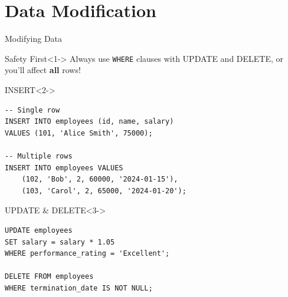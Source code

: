 \documentclass[aspectratio=169,11pt]{beamer}
\begin{document}
\section{Data Modification}
\begin{frame}[fragile]{Modifying Data}
\begin{alertblock}{\textcolor{red}{} Safety First}<1->
Always use \texttt{WHERE} clauses with UPDATE and DELETE, or you'll affect \textbf{all} rows!
\end{alertblock}

\pause
\begin{exampleblock}{INSERT}<2->
\begin{lstlisting}
-- Single row
INSERT INTO employees (id, name, salary)
VALUES (101, 'Alice Smith', 75000);

-- Multiple rows
INSERT INTO employees VALUES
    (102, 'Bob', 2, 60000, '2024-01-15'),
    (103, 'Carol', 2, 65000, '2024-01-20');
\end{lstlisting}
\end{exampleblock}

\pause
\begin{exampleblock}{UPDATE \& DELETE}<3->
\begin{lstlisting}
UPDATE employees
SET salary = salary * 1.05
WHERE performance_rating = 'Excellent';

DELETE FROM employees
WHERE termination_date IS NOT NULL;
\end{lstlisting}
\end{exampleblock}
\end{frame}

\end{document}
